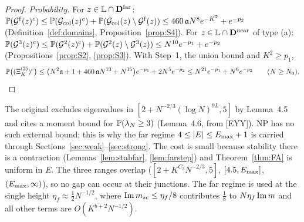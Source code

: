 \begin{proof}
\emph{Probability.} For $z\in\mathbb L\cap\mathbf{D}^{\rm far}$: $\mathbb{P}(\mathcal{G}^{\rm f}(z)^c)\le\mathbb{P}(\mathcal{G}_{\rm col}(z)^c)+\mathbb{P}(\mathcal{G}_{\rm col}(z)\setminus\mathcal{G}^{\rm f}(z))\le460\,\mathfrak{a} N^8e^{-K^2}+e^{-p_2}$ (Definition~\ref{def:domains}, Proposition~\ref{prop:S4}).
For $z\in\mathbb L\cap\mathbf{D}^{\rm near}$ of type (a): $\mathbb{P}(\mathcal{G}^3(z)^c)\le\mathbb{P}(\mathcal{G}^2(z)^c)+\mathbb{P}(\mathcal{G}^2(z)\setminus\mathcal{G}^3(z))\le N^{10}e^{-p_1}+e^{-p_2}$ (Propositions~\ref{prop:S2}, \ref{prop:S3}). With Step~1, the union bound and $K^2\ge p_1$,
\[
 \mathbb{P}\big((\Xi_K^{(2)})^c\big)\le\big(N^2\mathfrak{a}+1+460\,\mathfrak{a} N^{13}+N^{15}\big)e^{-p_1}+2N^5e^{-p_2}\le N^{21}e^{-p_1}+N^6e^{-p_2}\qquad(N\ge N_0).\qedhere
\]
\end{proof}

\begin{remark}
The original excludes eigenvalues in $[2+N^{-2/3}(\log N)^{9L},5]$ by Lemma~4.5 and cites a moment bound for $\mathbb{P}(\lambda_N\ge3)$ (Lemma~4.6, from [EYY]). NP has no such external bound; this is why the far regime $4\le|E|\le E_{\max}+1$ is carried through Sections~\ref{sec:weak}--\ref{sec:strong}.
The cost is small because stability there is a contraction (Lemmas~\ref{lem:stabfar}, \ref{lem:farstep}) and Theorem~\ref{thm:FA} is uniform in $E$. The three ranges overlap ($[2+K^{C_3}N^{-2/3},5]$, $[4.5,E_{\max}]$, $(E_{\max},\infty)$), so no gap can occur at their junctions.
The far regime is used at the single height $\eta_f\approx\frac12N^{-1/2}$, where $\operatorname{Im}m_{sc}\le\eta_f/8$ contributes $\frac18$ to $N\eta_f\operatorname{Im} m$ and all other terms are $O(K^{b+2}N^{-1/2})$.
\end{remark}

